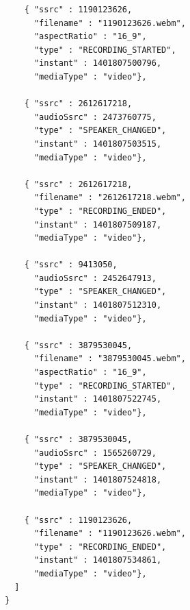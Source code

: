 \documentclass[twoside,openright,a4paper,12pt,english]{article}
\begin{document}
\begin{verbatim}
    { "ssrc" : 1190123626,
      "filename" : "1190123626.webm",
      "aspectRatio" : "16_9",
      "type" : "RECORDING_STARTED",
      "instant" : 1401807500796,
      "mediaType" : "video"},
      
    { "ssrc" : 2612617218,
      "audioSsrc" : 2473760775,
      "type" : "SPEAKER_CHANGED",
      "instant" : 1401807503515,
      "mediaType" : "video"},
      
    { "ssrc" : 2612617218,
      "filename" : "2612617218.webm",
      "type" : "RECORDING_ENDED",
      "instant" : 1401807509187,
      "mediaType" : "video"},
      
    { "ssrc" : 9413050,
      "audioSsrc" : 2452647913,
      "type" : "SPEAKER_CHANGED",
      "instant" : 1401807512310,
      "mediaType" : "video"},
      
    { "ssrc" : 3879530045,
      "filename" : "3879530045.webm",
      "aspectRatio" : "16_9",
      "type" : "RECORDING_STARTED",
      "instant" : 1401807522745,
      "mediaType" : "video"},
      
    { "ssrc" : 3879530045,
      "audioSsrc" : 1565260729,
      "type" : "SPEAKER_CHANGED",
      "instant" : 1401807524818,
      "mediaType" : "video"},
      
    { "ssrc" : 1190123626,
      "filename" : "1190123626.webm",
      "type" : "RECORDING_ENDED",
      "instant" : 1401807534861,
      "mediaType" : "video"},
  ]
}
\end{verbatim}




\clearpage


\end{document}
